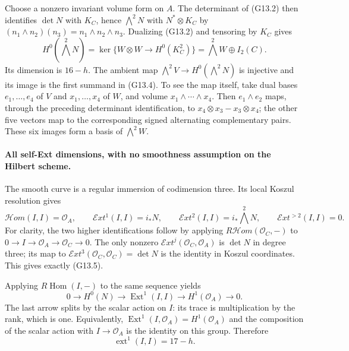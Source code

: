 Choose a nonzero invariant volume form on $A$. The determinant
of (G13.2) then identifies $\det N$ with $K_C$, hence
$\bigwedge^2N$ with $N^*\otimes K_C$ by
$(n_1\wedge n_2)(n_3)=n_1\wedge n_2\wedge n_3$.
Dualizing (G13.2) and tensoring by $K_C$ gives
\[
 H^0(\textstyle\bigwedge^2N)
   =\ker\{W\otimes W\longrightarrow H^0(K_C^2)\}
   =\bigwedge^2W\oplus I_2(C).                           \tag{G13.4}
\]
Its dimension is $16-h$. The ambient map
$\bigwedge^2V\to H^0(\bigwedge^2N)$ is injective and its image
is the first summand in (G13.4). To see the map itself, take
dual bases $e_1,\ldots,e_4$ of $V$ and $x_1,\ldots,x_4$ of $W$,
and volume $x_1\wedge\cdots\wedge x_4$. Then $e_1\wedge e_2$
maps, through the preceding determinant identification, to
$x_4\otimes x_3-x_3\otimes x_4$; the other five vectors map to
the corresponding signed alternating complementary pairs.
These six images form a basis of $\bigwedge^2W$.

\paragraph{All self-Ext dimensions, with no smoothness assumption
on the Hilbert scheme.}
The smooth curve is a regular immersion of codimension three.
Its local Koszul resolution gives
\[
 \mathcal H om(I,I)=\mathcal O_A,\qquad
 \mathcal E xt^1(I,I)=i_*N,\qquad
 \mathcal E xt^2(I,I)=i_*\bigwedge^2N,
 \qquad\mathcal E xt^{>2}(I,I)=0.                         \tag{G13.5}
\]
For clarity, the two higher identifications follow by applying
$R\mathcal H om(\mathcal O_C,-)$ to
$0\to I\to\mathcal O_A\to\mathcal O_C\to0$.
The only nonzero $\mathcal E xt^j(\mathcal O_C,\mathcal O_A)$
is $\det N$ in degree three; its map to
$\mathcal E xt^3(\mathcal O_C,\mathcal O_C)=\det N$ is the
identity in Koszul coordinates. This gives exactly (G13.5).

Applying $R\operatorname{Hom}(I,-)$ to the same sequence yields
\[
 0\longrightarrow H^0(N)\longrightarrow
  \operatorname{Ext}^1(I,I)\longrightarrow H^1(\mathcal O_A)
  \longrightarrow0.
\]
The last arrow splits by the scalar action on $I$: its trace
is multiplication by the rank, which is one. Equivalently,
$\operatorname{Ext}^1(I,\mathcal O_A)=H^1(\mathcal O_A)$
and the composition of the scalar action with $I\to\mathcal O_A$
is the identity on this group. Therefore
\[
 \operatorname{ext}^1(I,I)=17-h.
\]

